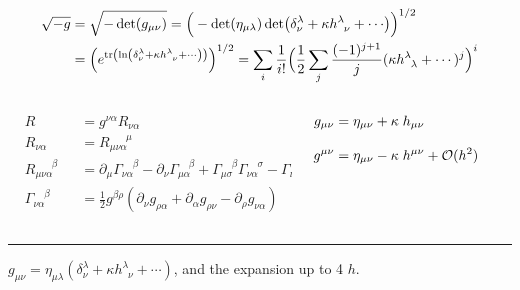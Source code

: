 \documentclass[aspectratio=169,usenames,dvipsnames]{beamer}
\begin{document}
\begin{frame}[t]{\centering {}\\
    {\centering{}}  } \footnotesize
{}
\begin{align*}
  \sqrt{-g} & = \sqrt{-\det(g_{\mu\nu})} = \Big (-\det(\eta_{\mu\lambda})\det(\delta^{\lambda}_{\nu} + \kappa h^{\lambda}_{\;\;\nu} + \cdots) \Big )^{1/2} \\
  & =\Big (e^{\tr(\ln(\delta^{\lambda}_{\nu} + \kappa h^{\lambda}_{\;\;\nu} + \cdots))} \Big )^{1/2}  = \sum_i \frac{1}{i!} \Big ( \frac{1}{2} \sum_j \frac{(-1)^{j+1}}{j} (\kappa h^{\lambda}_{\;\;\lambda} + \cdots  )^j     \Big )^i
\end{align*}
\begin{columns}
  \begin{column}{0.7\textwidth}
\begin{alignat*}{2}
  &R  &&= g^{\nu\alpha} R_{\nu\alpha} \\[3mm]
  &R_{\nu\alpha}&&=R_{\mu\nu\alpha}^{\;\;\;\;\;\;\mu} \\[3mm]
  &R_{\mu\nu\alpha}^{\;\;\;\;\;\;\beta} &&= \partial_{\mu} \Gamma_{\nu\alpha}^{\;\;\;\;\beta} - \partial_{\nu} \Gamma_{\mu\alpha}^{\;\;\;\;\beta} + \Gamma_{\mu\sigma}^{\;\;\;\;\beta} \Gamma_{\nu\alpha}^{\;\;\;\;\sigma} - \Gamma_{\nu\sigma}^{\;\;\;\;\beta} \Gamma_{\mu\alpha}^{\;\;\;\;\sigma} \\[3mm]
  &\Gamma_{\nu\alpha}^{\;\;\;\;\beta} &&=\frac{1}{2}g^{\beta\rho}(\partial_{\nu} g_{\rho\alpha} + \partial_{\alpha} g_{\rho\nu}- \partial_{\rho} g_{\nu\alpha}  )
\end{alignat*}
\end{column}
  \begin{column}{0.3\textwidth}
\begin{align*}
               g_{\mu\nu} &=   \eta_{\mu\nu} +  \kappa \; h_{\mu \nu} \hspace{30mm} \\[3mm]
  g^{\mu\nu} &=   \eta_{\mu\nu} -  \kappa \; h^{\mu \nu} + \mathcal{O}(h^2) \\[12mm]
\end{align*}
\end{column}
\end{columns}
\vspace{7.6mm}
\textcolor{LUCopper}{\rule{\textwidth}{1pt}}
\tiny $g_{\mu\nu} =\eta_{\mu\lambda} (\delta^{\lambda}_{\nu} +
  \kappa h^{\lambda}_{\;\;\nu} + \cdots)$, and the expansion up to 4 $h$.
\vspace{100mm}
\end{frame}
\end{document}
